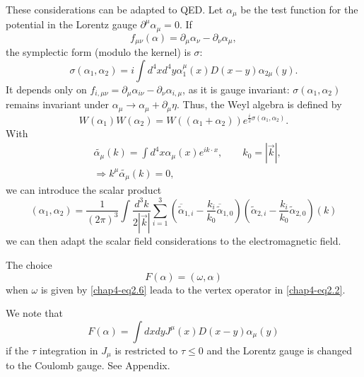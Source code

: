 These considerations can be adapted to QED. Let $\alpha_\mu$ be the test function for the potential in the Lorentz gauge $\partial^\mu \alpha_\mu =0$. If
\begin{equation}
f_{\mu \nu} (\alpha) = \partial_{\mu} \alpha_{\nu}- \partial_\nu \alpha_\mu, \label{chap4-eq-2.27}
\end{equation}
the symplectic form (modulo the kernel) is $\sigma:$
\begin{equation}
  \sigma (\alpha_1, \alpha_2) = i \int d^4 x d^4 y \alpha^\mu_1 (x) D (x-y) \alpha_{2 \mu} (y). \label{chap4-eq2.28}
\end{equation}
It depends only on $f_{i, \mu \nu}= \partial_\mu \alpha_{i \nu}- \partial_\nu \alpha_{i, \mu}$, as it is gauge invariant: $\sigma(\alpha_1, \alpha_2)$ remains invariant under $\alpha_\mu \to \alpha_\mu + \partial_{\mu} \eta$. Thus, the Weyl algebra is defined by
\begin{equation}
W (\alpha_1) W (\alpha_2)= W ((\alpha_1 + \alpha_2)) e^{\frac{i}{2} \sigma(\alpha_1, \alpha_2)}. \label{chap4-eq2.29}
\end{equation}
With
\begin{align}
  &\tilde{\alpha_\mu} (k) = \int d^4 x \alpha_\mu (x)e^{ik\cdot x}, \qquad k_0 = |\overrightarrow{k}|,\label{chap4-eq2.30}\\
  &\Longrightarrow k^{\mu} \tilde{\alpha_\mu} (k)=0,\label{chap4-eq2.31}
\end{align}
we can introduce the scalar product
\begin{equation}
(\alpha_1, \alpha_2)= \frac{1}{(2\pi)^3} \int \frac{d^3 k}{2|\overrightarrow{k}|} \sum^3_{i=1} \left(\overline{\tilde{\alpha}}_{1, i} -  \frac{k_i}{k_0} \overline{\tilde{\alpha}}_{1, 0}\right) (\tilde{\alpha}_{2, i}- \frac{k_i}{k_0} \tilde{\alpha}_{2, 0})(k) \label{chap4-eq2.32}
\end{equation}
we can then adapt the scalar field considerations to the electromagnetic field.

The choice
\begin{equation}
F(\alpha) = (\omega, \alpha) \label{chap4-eq2.33}
\end{equation}
when $\omega$ is given by \eqref{chap4-eq2.6} leada to the vertex operator in \eqref{chap4-eq2.2}.

We note that
\begin{equation}
F(\alpha) = \int dx dy {J}^\mu (x) {D}(x-y) \alpha_\mu (y) \label{chap4-eq2.34}
\end{equation}
if the $\tau$ integration in ${J}_\mu$ is restricted to $\tau \leq 0$ and the Lorentz gauge is changed to the Coulomb gauge. See Appendix.

